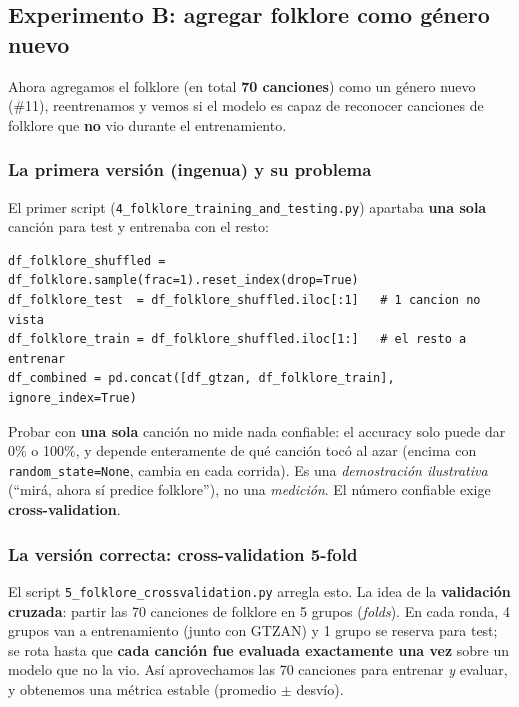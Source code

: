 \documentclass[11pt,a4paper]{article}
\newenvironment{defenbox}[1]{\begin{mdframed}[style=defenstyle,frametitle={#1}]}{\end{mdframed}}
\begin{document}
\subsection{Experimento B: agregar folklore como género nuevo}

Ahora agregamos el folklore (en total \textbf{70 canciones}) como un género
nuevo (\#11), reentrenamos y vemos si el modelo es capaz de reconocer canciones
de folklore que \textbf{no} vio durante el entrenamiento.

\subsubsection{La primera versión (ingenua) y su problema}

El primer script (\texttt{4\_folklore\_training\_and\_testing.py}) apartaba
\textbf{una sola} canción para test y entrenaba con el resto:

\begin{lstlisting}
df_folklore_shuffled = df_folklore.sample(frac=1).reset_index(drop=True)
df_folklore_test  = df_folklore_shuffled.iloc[:1]   # 1 cancion no vista
df_folklore_train = df_folklore_shuffled.iloc[1:]   # el resto a entrenar
df_combined = pd.concat([df_gtzan, df_folklore_train], ignore_index=True)
\end{lstlisting}

\begin{defenbox}{Por qué esto NO es una evaluación válida}
Probar con \textbf{una sola} canción no mide nada confiable: el accuracy solo
puede dar 0\% o 100\%, y depende enteramente de qué canción tocó al azar (encima
con \texttt{random\_state=None}, cambia en cada corrida). Es una
\emph{demostración ilustrativa} (``mirá, ahora sí predice folklore''), no una
\emph{medición}. El número confiable exige \textbf{cross-validation}.
\end{defenbox}

\subsubsection{La versión correcta: cross-validation 5-fold}

El script \texttt{5\_folklore\_crossvalidation.py} arregla esto. La idea de la
\textbf{validación cruzada}: partir las 70 canciones de folklore en 5 grupos
(\emph{folds}). En cada ronda, 4 grupos van a entrenamiento (junto con GTZAN) y
1 grupo se reserva para test; se rota hasta que \textbf{cada canción fue
evaluada exactamente una vez} sobre un modelo que no la vio. Así aprovechamos
las 70 canciones para entrenar \emph{y} evaluar, y obtenemos una métrica estable
(promedio $\pm$ desvío).
\end{document}
